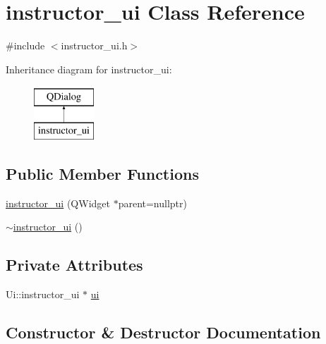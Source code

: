 \hypertarget{classinstructor__ui}{}\section{instructor\+\_\+ui Class Reference}
\label{classinstructor__ui}


{\ttfamily \#include $<$instructor\+\_\+ui.\+h$>$}

Inheritance diagram for instructor\+\_\+ui\+:\begin{figure}[H]
\begin{center}
\leavevmode
\includegraphics[height=2.000000cm]{classinstructor__ui}
\end{center}
\end{figure}
\subsection*{Public Member Functions}
\begin{DoxyCompactItemize}
\item 
\hyperlink{classinstructor__ui_ae35db21e8974fa67306bd2aacd020f5e}{instructor\+\_\+ui} (Q\+Widget $\ast$parent=nullptr)
\item 
\hyperlink{classinstructor__ui_a231edb26c3be0e21aa0920d71c3da23f}{$\sim$instructor\+\_\+ui} ()
\end{DoxyCompactItemize}
\subsection*{Private Attributes}
\begin{DoxyCompactItemize}
\item 
Ui\+::instructor\+\_\+ui $\ast$ \hyperlink{classinstructor__ui_a3d9ce8b657212972dbfd0ffd5ef7c8ea}{ui}
\end{DoxyCompactItemize}


\subsection{Constructor \& Destructor Documentation}
\mbox{\label{classinstructor__ui_ae35db21e8974fa67306bd2aacd020f5e}} 
